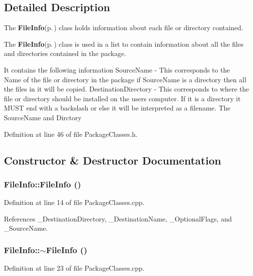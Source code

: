 \subsection{Detailed Description}
The {\bf File\-Info}{\rm (p.\,\pageref{class_file_info})} class holds information about each file or directory contained. 

The {\bf File\-Info}{\rm (p.\,\pageref{class_file_info})} class is used in a list to contain information about all the files and directories contained in the package.

It contains the following information Source\-Name - This corresponds to the Name of the file or directory in the package if Source\-Name is a directory then all the files in it will be copied. Destination\-Directory - This corresponds to where the file or directory should be installed on the users computer. If it is a directory it MUST end with a backslash or else it will be interpreted as a filename. The Source\-Name and Dirctory 



Definition at line 46 of file Package\-Classes.h.

\subsection{Constructor \& Destructor Documentation}
\subsubsection{\setlength{\rightskip}{0pt plus 5cm}File\-Info::File\-Info ()}\label{class_file_info_8541904af8536fa35f7addd9e855c4a1}




Definition at line 14 of file Package\-Classes.cpp.

References \_\-Destination\-Directory, \_\-Destination\-Name, \_\-Optional\-Flags, and \_\-Source\-Name.
\subsubsection{\setlength{\rightskip}{0pt plus 5cm}File\-Info::$\sim$File\-Info ()}\label{class_file_info_b771dfaca29680c93810af82a7a99958}




Definition at line 23 of file Package\-Classes.cpp.

